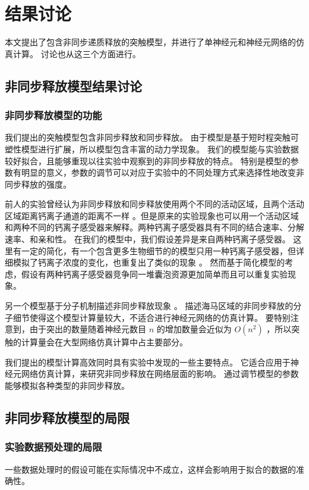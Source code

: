 \chapter{结果讨论}
\label{chapter:discussion}
本文提出了包含非同步递质释放的突触模型，并进行了单神经元和神经元网络的仿真计算。
讨论也从这三个方面进行。

\section{非同步释放模型结果讨论}
\label{section:discussion:model}

\subsection{非同步释放模型的功能}
\label{section:discussion:model-features}
我们提出的突触模型包含非同步释放和同步释放。
由于模型是基于短时程突触可塑性模型进行扩展，所以模型包含丰富的动力学现象。
我们的模型能与实验数据较好拟合，且能够重现以往实验中观察到的非同步释放的特点。
特别是模型的参数有明显的意义，参数的调节可以对应于实验中的不同处理方式来选择性地改变非同步释放的强度。

前人的实验曾经认为非同步释放和同步释放使用两个不同的活动区域，且两个活动区域距离钙离子通道的距离不一样 \cite{Hefft2005}。但是原来的实验现象也可以用一个活动区域和两种不同的钙离子感受器来解释。两种钙离子感受器具有不同的结合速率、分解速率、和亲和性。
在我们的模型中，我们假设差异是来自两种钙离子感受器。
这里有一定的简化，有一个包含更多生物细节的的模型只用一种钙离子感受器，但详细模拟了钙离子浓度的变化，也重复出了类似的现象 \cite{Pan2009}。
然而基于简化模型的考虑，假设有两种钙离子感受器竞争同一堆囊泡资源更加简单而且可以重复实验现象。

另一个模型基于分子机制描述非同步释放现象 \cite{Nadkarni2010}。
描述海马区域的非同步释放的分子细节使得这个模型计算量较大，不适合进行神经元网络的仿真计算。
要特别注意到，由于突出的数量随着神经元数目 $n$ 的增加数量会近似为 $O(n^2)$ ，所以突触的计算量会在大型网络仿真计算中占主要部分。

我们提出的模型计算高效同时具有实验中发现的一些主要特点。
它适合应用于神经元网络仿真计算，来研究非同步释放在网络层面的影响。
通过调节模型的参数能够模拟各种类型的非同步释放。

\section{非同步释放模型的局限}
\label{section:discussion:limitations}

\subsection{实验数据预处理的局限}
\label{section:discussion:preprocessing}
一些数据处理时的假设可能在实际情况中不成立，这样会影响用于拟合的数据的准确性。

